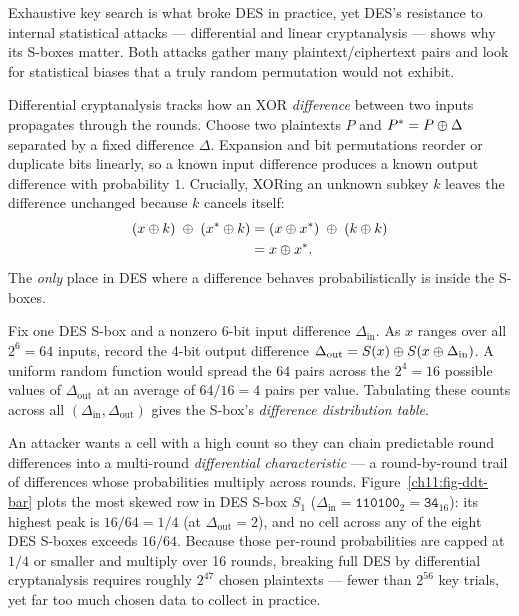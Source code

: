 Exhaustive key search is what broke DES in practice, yet DES's resistance to internal statistical attacks --- differential and linear cryptanalysis --- shows why its S-boxes matter. Both attacks gather many plaintext/ciphertext pairs and look for statistical biases that a truly random permutation would not exhibit.

Differential cryptanalysis tracks how an XOR \emph{difference} between two inputs propagates through the rounds. Choose two plaintexts $P$ and $P^* = P \oplus \Delta$ separated by a fixed difference $\Delta$. Expansion and bit permutations reorder or duplicate bits linearly, so a known input difference produces a known output difference with probability $1$. Crucially, XORing an unknown subkey $k$ leaves the difference unchanged because $k$ cancels itself:
\begin{align*}
(x \oplus k) \;\oplus\; (x^* \oplus k)
  &= (x \oplus x^*) \;\oplus\; (k \oplus k) \\
  &= x \oplus x^*.
\end{align*}
The \emph{only} place in DES where a difference behaves probabilistically is inside the S-boxes.

\begin{example}
\label{ch11:ex-diff}
Fix one DES S-box and a nonzero 6-bit input difference $\Delta_{\mathrm{in}}$. As $x$ ranges over all $2^6 = 64$ inputs, record the 4-bit output difference $\Delta_{\mathrm{out}} = S(x) \oplus S(x \oplus \Delta_{\mathrm{in}})$. A uniform random function would spread the $64$ pairs across the $2^4 = 16$ possible values of $\Delta_{\mathrm{out}}$ at an average of $64/16 = 4$ pairs per value. Tabulating these counts across all $(\Delta_{\mathrm{in}}, \Delta_{\mathrm{out}})$ gives the S-box's \emph{difference distribution table}.

An attacker wants a cell with a high count so they can chain predictable round differences into a multi-round \emph{differential characteristic} --- a round-by-round trail of differences whose probabilities multiply across rounds. Figure~\ref{ch11:fig-ddt-bar} plots the most skewed row in DES S-box $S_1$ ($\Delta_{\mathrm{in}} = \texttt{110100}_2 = \texttt{34}_{16}$): its highest peak is $16/64 = 1/4$ (at $\Delta_{\mathrm{out}} = 2$), and no cell across any of the eight DES S-boxes exceeds $16/64$. Because those per-round probabilities are capped at $1/4$ or smaller and multiply over 16 rounds, breaking full DES by differential cryptanalysis requires roughly $2^{47}$ chosen plaintexts --- fewer than $2^{56}$ key trials, yet far too much chosen data to collect in practice.
\end{example}

